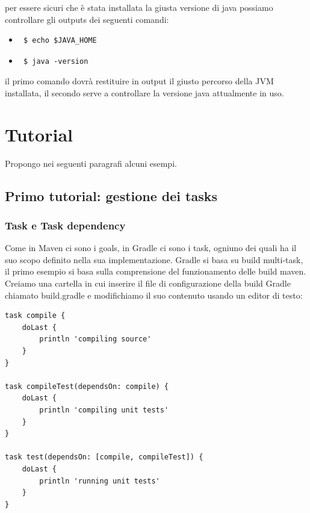 \documentclass{article}
\begin{document}
\begin{flushleft}
per essere sicuri che è stata installata la giusta versione di java possiamo controllare gli outputs dei seguenti comandi:
\begin{itemize}
  \item 
  \begin{verbatim} $ echo $JAVA_HOME \end{verbatim}
  \item \begin{verbatim} $ java -version \end{verbatim}
\end{itemize}
il primo comando dovrà restituire in output il giusto percorso della JVM installata, il secondo serve a controllare la versione java attualmente in uso.


\section{Tutorial} %
Propongo nei seguenti paragrafi alcuni esempi.

\subsection{Primo tutorial: gestione dei tasks}

\subsubsection{Task e Task dependency}
Come in Maven ci sono i goals, in Gradle ci sono i task, ogniuno dei quali ha il suo scopo definito nella sua implementazione. Gradle si basa su build multi-task, il primo esempio si basa sulla comprensione del funzionamento delle build maven. Creiamo una cartella in cui inserire il file di configurazione della build Gradle chiamato build.gradle e modifichiamo il suo contenuto usando un editor di testo:
\begin{verbatim}
task compile {
    doLast {
        println 'compiling source'
    }
}

task compileTest(dependsOn: compile) {
    doLast {
        println 'compiling unit tests'
    }
}

task test(dependsOn: [compile, compileTest]) {
    doLast {
        println 'running unit tests'
    }
}


\end{verbatim}
\end{flushleft}
\end{document}
